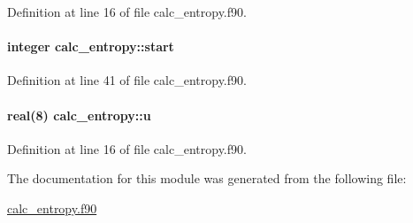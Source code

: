 Definition at line 16 of file calc\-\_\-entropy.\-f90.

\hypertarget{classcalc__entropy_a956e6d4e2fc8c2d4dbc414d534e5c49d}{
\paragraph[{start}]{\setlength{\rightskip}{0pt plus 5cm}integer calc\-\_\-entropy\-::start}}\label{classcalc__entropy_a956e6d4e2fc8c2d4dbc414d534e5c49d}


Definition at line 41 of file calc\-\_\-entropy.\-f90.

\hypertarget{classcalc__entropy_ab98127dc795d8a07522c22aff868c11b}{
\paragraph[{u}]{\setlength{\rightskip}{0pt plus 5cm}real(8) calc\-\_\-entropy\-::u}}\label{classcalc__entropy_ab98127dc795d8a07522c22aff868c11b}


Definition at line 16 of file calc\-\_\-entropy.\-f90.



The documentation for this module was generated from the following file\-:\begin{DoxyCompactItemize}
\item 
\hyperlink{calc__entropy_8f90}{calc\-\_\-entropy.\-f90}\end{DoxyCompactItemize}
